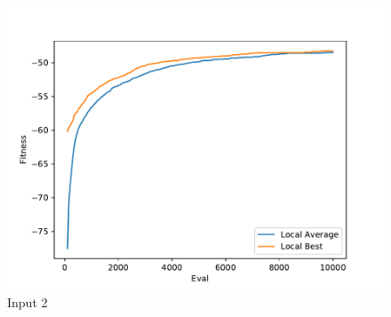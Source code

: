 \documentclass{standalone}
\begin{document}
\begin{figure}[!htb]
	\caption{Input 2}
	\label{fig:graph_2004}
	\includegraphics[width=\textwidth]{../graphs/graphs/2004.pdf}
\end{figure}
\end{document}
